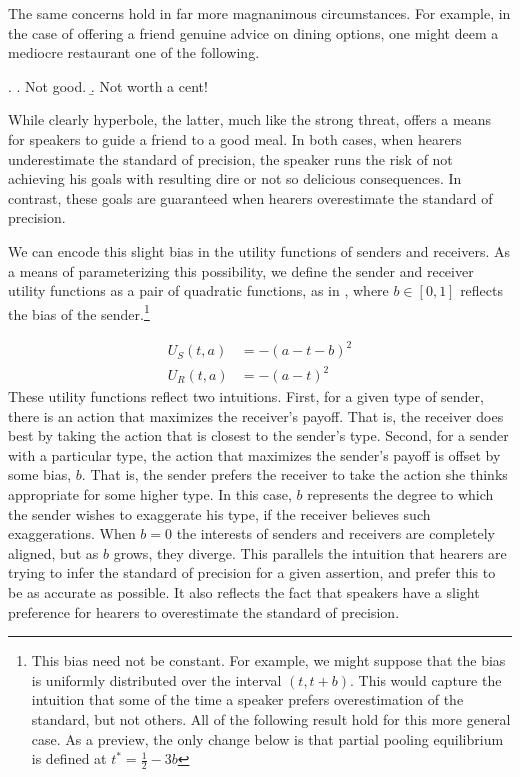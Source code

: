 The same concerns hold in far more magnanimous circumstances. For example, in the case of offering a friend genuine advice on dining options, one might deem a mediocre restaurant one of the following.

 \ex. \a. Not good.
      \b. Not worth a cent!

While clearly hyperbole, the latter, much like the strong threat, offers a means for speakers to guide a friend to a good meal. In both cases, when hearers underestimate the standard of precision, the speaker runs the risk of not achieving his goals with resulting dire or not so delicious consequences. In contrast, these goals are guaranteed when hearers overestimate the standard of precision.

We can encode this slight bias in the utility functions of senders and receivers. As a means of parameterizing this possibility, we define the sender and receiver utility functions as a pair of quadratic functions, as in \cite{crawford-sobel:1982}, where $b \in [0,1]$ reflects the bias of the sender.\footnote{This bias need not be constant. For example, we might suppose that the bias is uniformly distributed over the interval $(t,t+b)$. This would capture the intuition that some of the time a speaker prefers overestimation of the standard, but not others. All of the following result hold for this more general case. As a preview, the only change below is that partial pooling equilibrium is defined at $t^* = \frac{1}{2} - 3b$ }

\begin{equation}
\begin{split}
     U_S(t, a) &= -(a - t - b)^2\\
  	 U_R(t, a) &= -(a - t)^2
\end{split}
\end{equation}
These utility functions reflect two intuitions. First, for a given type of sender, there is an action that maximizes the receiver's payoff. That is, the receiver does best by taking the action that is closest to the sender's type. Second, for a sender with a particular type, the action that maximizes the sender's payoff is offset by some bias, $b$. That is, the sender prefers the receiver to take the action she thinks appropriate for some higher type. In this case, $b$ represents the degree to which the sender wishes to exaggerate his type, if the receiver believes such exaggerations. When $b=0$ the interests of senders and receivers are completely aligned, but as $b$ grows, they diverge. This parallels the intuition that hearers are trying to infer the standard of precision for a given assertion, and prefer this to be as accurate as possible. It also reflects the fact that speakers have a slight preference for hearers to overestimate the standard of precision.

